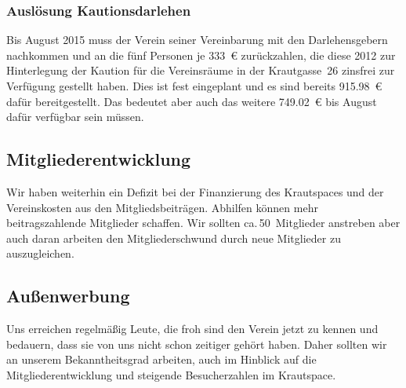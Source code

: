 \documentclass[ngerman]{scrartcl}
\begin{document}
\subsubsection{Auslösung Kautionsdarlehen}
\label{sec:katrionsdarlehen}
Bis August 2015 muss der Verein seiner Vereinbarung mit den Darlehensgebern nachkommen und an die fünf Personen je \num{333}~\euro{} zurückzahlen, die diese 2012 zur Hinterlegung der Kaution für die Vereinsräume in der Krautgasse~26 zinsfrei zur Verfügung gestellt haben.
Dies ist fest eingeplant und es sind bereits \num{915,98}~\euro{} dafür bereitgestellt.
Das bedeutet aber auch das weitere \num{749,02}~\euro{} bis August dafür verfügbar sein müssen.

\subsection{Mitgliederentwicklung}
Wir haben weiterhin ein Defizit bei der Finanzierung des Krautspaces und der Vereinskosten aus den Mitgliedsbeiträgen.
Abhilfen können mehr beitragszahlende Mitglieder schaffen.
Wir sollten ca.\,50~Mitglieder anstreben aber auch daran arbeiten den Mitgliederschwund durch neue Mitglieder zu auszugleichen.

\subsection{Außenwerbung}
Uns erreichen regelmäßig Leute, die froh sind den Verein jetzt zu kennen und bedauern, dass sie von uns nicht schon zeitiger gehört haben.
Daher sollten wir an unserem Bekanntheitsgrad arbeiten, auch im Hinblick auf die Mitgliederentwicklung und steigende Besucherzahlen im Krautspace.
\end{document}
